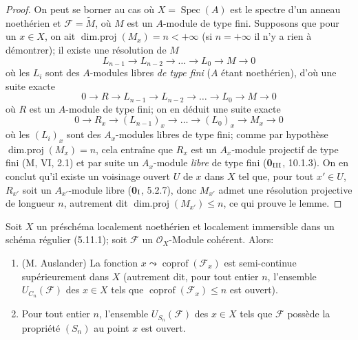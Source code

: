 \begin{proof}
On peut se borner au cas où $X=\operatorname{Spec}(A)$ est le spectre d'un
anneau noethérien et $\mathcal F=\widetilde M$, où $M$ est un $A$-module de
type fini. Supposons que pour un $x\in X$, on ait
$\operatorname{dim.proj}(M_x)=n<+\infty$ (si $n=+\infty$ il n'y a rien à
démontrer); il existe une résolution de $M$
\[
L_{n-1}\longrightarrow L_{n-2}\longrightarrow\ldots
\longrightarrow L_0\longrightarrow M\longrightarrow0
\]
où les $L_i$ sont des $A$-modules libres \emph{de type fini} ($A$ étant
noethérien), d'où une suite exacte
\[
0\longrightarrow R\longrightarrow L_{n-1}\longrightarrow L_{n-2}
\longrightarrow\ldots\longrightarrow L_0\longrightarrow M
\longrightarrow0
\]
où $R$ est un $A$-module de type fini; on en déduit une suite exacte
\[
0\longrightarrow R_x\longrightarrow(L_{n-1})_x\longrightarrow\ldots
\longrightarrow(L_0)_x\longrightarrow M_x\longrightarrow0
\]
où les $(L_i)_x$ sont des $A_x$-modules libres de type fini; comme par
hypothèse $\operatorname{dim.proj}(M_x)=n$, cela entraîne que $R_x$ est un
$A_x$-module projectif de type fini (M, VI, 2.1) et par suite un
$A_x$-module \emph{libre} de type fini (\textbf{0}$_{\rm III}$, 10.1.3). On en conclut qu'il
existe un voisinage ouvert $U$ de $x$ dans $X$ tel que, pour tout
$x'\in U$, $R_{x'}$ soit un $A_{x'}$-module libre (\textbf{0}$_{\rm I}$, 5.2.7),
donc $M_{x'}$ admet une résolution projective de longueur $n$, autrement
dit $\operatorname{dim.proj}(M_{x'})\leq n$, ce qui prouve le lemme.
\end{proof}

\begin{proposition}[6.11.2]
\label{IV.2.s6.11.2-fr}
Soit $X$ un préschéma localement noethérien et localement immersible dans
un schéma régulier \textup{(5.11.1)}; soit $\mathcal F$ un $\mathcal O_X$-Module
cohérent. Alors:
\begin{enumerate}
\item[\textup{(i)}] \textup{(M. Auslander)} La fonction
$x\leadsto\operatorname{coprof}(\mathcal F_x)$ est semi-continue
supérieurement dans $X$ \textup{(autrement dit, pour tout entier $n$, l'ensemble
$U_{C_n}(\mathcal F)$ des $x\in X$ tels que
$\operatorname{coprof}(\mathcal F_x)\leq n$ est} ouvert).
\item[\textup{(ii)}] Pour tout entier $n$, l'ensemble $U_{S_n}(\mathcal F)$ des
$x\in X$ tels que $\mathcal F$ possède la propriété $(S_n)$ au point $x$
est ouvert.
\end{enumerate}
\end{proposition}

